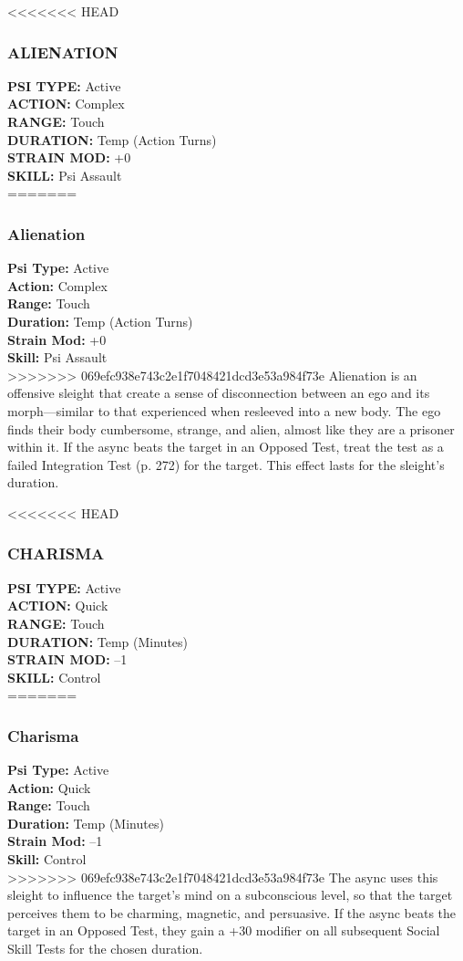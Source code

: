 <<<<<<< HEAD
\subsubsection{ALIENATION}
\textbf{PSI TYPE:} Active \\ 
\textbf{ACTION:} Complex \\ 
\textbf{RANGE:} Touch \\ 
\textbf{DURATION:} Temp (Action Turns) \\
\textbf{STRAIN MOD:} +0 \\ 
\textbf{SKILL:} Psi Assault \\
=======
\subsubsection{Alienation}
\textbf{Psi Type:} Active \\ 
\textbf{Action:} Complex \\ 
\textbf{Range:} Touch \\ 
\textbf{Duration:} Temp (Action Turns) \\
\textbf{Strain Mod:} +0 \\ 
\textbf{Skill:} Psi Assault \\
>>>>>>> 069efc938e743c2e1f7048421dcd3e53a984f73e
Alienation is an offensive sleight that create a sense of
disconnection between an ego and its morph—similar
to that experienced when resleeved into a new body.
The ego finds their body cumbersome, strange, and
alien, almost like they are a prisoner within it. If the
async beats the target in an Opposed Test, treat the
test as a failed Integration Test (p. 272) for the target.
This effect lasts for the sleight’s duration.

<<<<<<< HEAD
\subsubsection{CHARISMA}
\textbf{PSI TYPE:} Active \\ 
\textbf{ACTION:} Quick \\ 
\textbf{RANGE:} Touch \\ 
\textbf{DURATION:} Temp (Minutes) \\
\textbf{STRAIN MOD:} –1 \\ 
\textbf{SKILL:} Control\\
=======
\subsubsection{Charisma}
\textbf{Psi Type:} Active \\ 
\textbf{Action:} Quick \\ 
\textbf{Range:} Touch \\ 
\textbf{Duration:} Temp (Minutes) \\
\textbf{Strain Mod:} –1 \\ 
\textbf{Skill:} Control\\
>>>>>>> 069efc938e743c2e1f7048421dcd3e53a984f73e
The async uses this sleight to influence the target’s
mind on a subconscious level, so that the target perceives
them to be charming, magnetic, and persuasive.
If the async beats the target in an Opposed Test, they
gain a +30 modifier on all subsequent Social Skill
Tests for the chosen duration.


